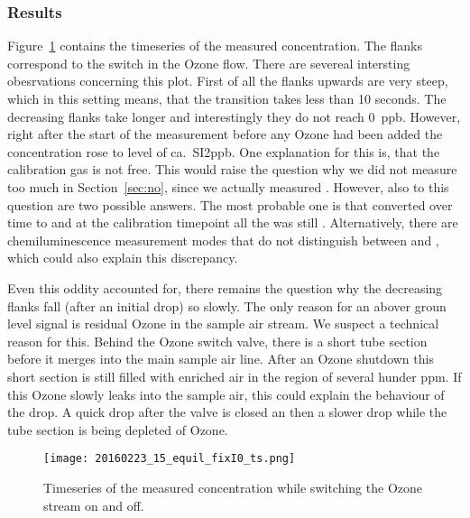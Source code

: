\subsubsection{Results}
\label{sec:switch-results}

Figure~\ref{fig:switch} contains the timeseries of the measured
 concentration. The flanks correspond to the switch in the
Ozone flow. There are severeal intersting obesrvations concerning this
plot. First of all the flanks upwards are very steep, which in this
setting means, that the transition takes less than 10 seconds. The
decreasing flanks take longer and interestingly they do not reach
\SI{0}{ppb}. However, right after the start of the measurement before
any Ozone had been added the concentration rose to level of ca.\
SI{2}{ppb}. One explanation for this is, that the calibration gas is
not \ch{NO2} free. This would raise the question why we did not
measure too much  in Section~\ref{sec:no}, since we actually
measured \ch{NO_x}. However, also to this question are two possible
answers. The most probable one is that  converted over time to
 and at the calibration timepoint all the  was still
. Alternatively, there are chemiluminescence measurement modes
that do not distinguish between \ch{NO} and \ch{NO2}, which could also
explain this discrepancy. 

Even this oddity accounted for, there remains the question why the
decreasing flanks fall (after an initial drop) so slowly. The only
reason for an abover groun level \ch{NO2} signal is residual Ozone in
the sample air stream. We suspect a technical reason for this. Behind
the Ozone switch valve, there is a short tube section before it merges
into the main sample air line. After an Ozone shutdown this short
section is still filled with \ch{O3} enriched air in the region of
several hunder \si{ppm}. If this Ozone slowly leaks into the sample
air, this could explain the behaviour of the drop. A quick drop after
the valve is closed an then a slower drop while the tube section is
being depleted of Ozone.

\begin{figure}[htbp]
  \centering
  \texttt{[image: 20160223\_15\_equil\_fixI0\_ts.png]}
  \caption{Timeseries of the measured  concentration while
    switching the Ozone stream on and off.}
  \label{fig:switch}
\end{figure}


